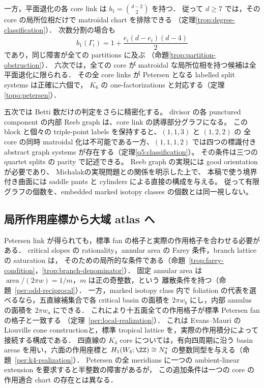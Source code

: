 一方，平面退化の各 core link は
$b_1=\binom{d-2}{2}$ を持つ．
従って $d\geq7$ では，その core の局所位相だけで matroidal chart を排除できる
（定理\ref{trop:degree-classification}）．
次数分割の場合も
\[
 b_1(\Gamma_i)=1+\frac{e_i(d-e_i)(d-4)}2
\]
であり，同じ障害が全ての partitions に及ぶ
（命題\ref{trop:partition-obstruction}）．
六次では，全ての core が matroidal な局所位相を持つ候補は全平面退化に限られる．
その全 core links が Petersen となる labelled split systems は正確に六個で，
$K_6$ の one-factorizations と対応する（定理\ref{topo:petersen}）．

五次では Betti 数だけの判定をさらに精密化する。
divisor の各 punctured component の内部 Reeb graph は、core link の誘導部分グラフになる。
この block と個々の triple-point labels を保持すると、$(1,1,3)$ と $(1,2,2)$ の
全 core の同時 matroidal 化は不可能である一方、$(1,1,1,2)$ では四つの標識付き
abstract graph systems が存在する（定理\ref{q5:classification}）。
その条件は三つの quartet splits の parity で記述できる。
Reeb graph の実現には good orientation が必要であり、
Michalak\cite[Definition 2.2, Theorem 5.6]{MichalakReeb}の実現問題との関係を明示した上で、
本稿で使う境界付き曲面には saddle pants と cylinders による直接の構成を与える。
従って有限グラフの個数を、embedded marked isotopy classes の個数とは同一視しない。


\subsection{局所作用座標から大域 atlas へ}

Petersen link が得られても，標準 fan の格子と実際の作用格子を合わせる必要がある．
critical slopes の rationality，annular area の Farey 条件，branch lattice の saturation は，
そのための局所的な条件である（命題~\ref{trop:farey-condition}，\ref{trop:branch-denominator}）．
固定 annular area は $\operatorname{area}/(2\pi w)=1/m$，$m$ は正の奇整数，という
離散条件を持つ（命題~\ref{per:odd-reciprocal}）．
一方，marked isotopy class 内で foliation の代表を選べるなら，五直線補集合で各 critical
basin の面積を $2\pi w_b$ にし，内部 annulus の面積を $2\pi w_a$ にできる．
これにより十五面全ての作用格子が標準 Petersen fan の格子と一致する
（定理~\ref{per:local-realization}）．
これは Evans--Mauri の Liouville cone construction\cite{EM}と，標準 tropical lattice
\cite{GKM}を，実際の作用積分によって接続する構成である．
四直線の $K_4$ core については，有向四周期に沿う basin areas を用い，六面の作用座標と
$H_1(W_4;\ZZ)\cong N_4^*$ の整数同型を与える（命題~\ref{per:k4-realization}）．
Petersen の全 meridians に一つの ambient-linear extension を要求すると半整数の障害があるが，
この追加条件は一つの core の作用適合 chart の存在とは異なる．

